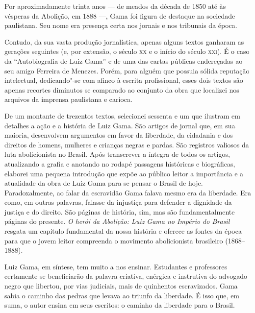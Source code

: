 Por aproximadamente trinta anos --- de meados da década de 1850 até às
vésperas da Abolição, em 1888 ---, Gama foi figura de destaque na
sociedade paulistana. Seu nome era presença certa nos jornais e nos
tribunais da época.

Contudo, da sua vasta produção jornalística, apenas alguns textos
ganharam as gerações seguintes (e, por extensão, o século \textsc{xx} e o início
do século \textsc{xxi}). É o caso da ``Autobiografia de Luiz Gama'' e de uma das
cartas públicas endereçadas ao seu amigo Ferreira de Menezes. Porém,
para alguém que possuia sólida reputação intelectual, dedicando"-se com
afinco à escrita profissional, esses dois textos são apenas recortes
diminutos se comparado ao conjunto da obra que localizei nos arquivos da
imprensa paulistana e carioca.

De um montante de trezentos textos, selecionei sessenta e um que
ilustram em detalhes a ação e a história de Luiz Gama. São artigos de
jornal que, em sua maioria, desenvolvem argumentos em favor da
liberdade, da cidadania e dos direitos de homens, mulheres e crianças
negras e pardas. São registros valiosos da luta abolicionista no Brasil.
Após transcrever a íntegra de todos os artigos, atualizando a grafia e
anotando no rodapé passagens históricas e biográficas, elaborei uma
pequena introdução que expõe ao público leitor a importância e a
atualidade da obra de Luiz Gama para se pensar o Brasil de hoje.
Paradoxalmente, ao falar da escravidão Gama falava mesmo era da
liberdade. Era como, em outras palavras, falasse da injustiça para
defender a dignidade da justiça e do direito. São páginas de história,
sim, mas são fundamentalmente páginas do presente. \emph{O herói
da Abolição: Luiz Gama no Império do Brasil} resgata um capítulo
fundamental da nossa história e oferece as fontes da época para que o
jovem leitor compreenda o movimento abolicionista brasileiro
(1868--1888).

Luiz Gama, em síntese, tem muito a nos ensinar. Estudantes e professores
certamente se beneficiarão da palavra criativa, enérgica e instrutiva do
advogado negro que libertou, por vias judiciais, mais de quinhentos
escravizados. Gama sabia o caminho das pedras que levava ao triunfo da
liberdade. É isso que, em suma, o autor ensina em seus escritos: o
caminho da liberdade para o Brasil.


\pagebreak
\paginabranca
\mbox{}\vfill
\thispagestyle{empty}


